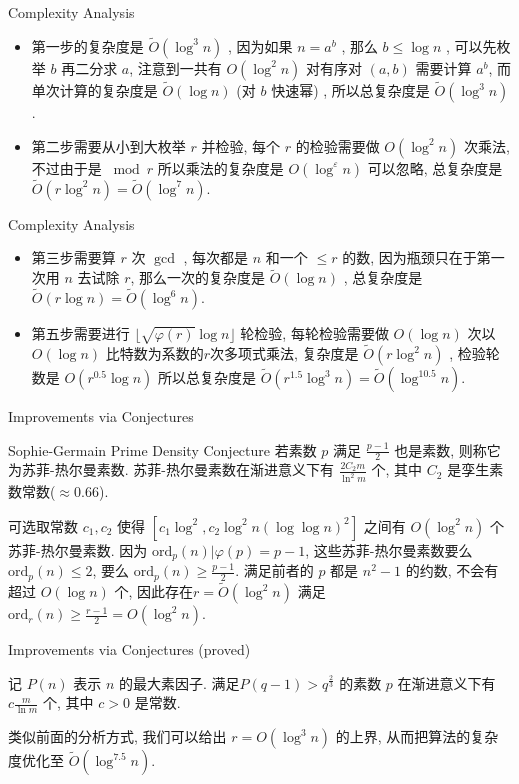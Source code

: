 \documentclass{beamer}
\def\le{\leqslant}
\def\ge{\geqslant}
\def\ord{\textrm{ord}}
\begin{document}
\begin{frame}{Complexity Analysis}
	\begin{itemize}
		\item 第一步的复杂度是 $\tilde O(\log^3n)$ , 因为如果 $n = a^b$ , 那么 $b \le \log n$ , 可以先枚举 $b$ 再二分求 $a$, 注意到一共有 $O(\log^2n)$ 对有序对 $(a, b)$ 需要计算 $a^b$, 而单次计算的复杂度是 $\tilde O(\log n)$ (对 $b$ 快速幂) , 所以总复杂度是 $\tilde O(\log^3n)$. \pause
		\item 第二步需要从小到大枚举 $r$ 并检验, 每个 $r$ 的检验需要做 $O(\log^2n)$ 次乘法, 不过由于是 $\bmod r$ 所以乘法的复杂度是 $O(\log^{\varepsilon} n)$ 可以忽略, 总复杂度是 $\tilde O(r\log^2n) = \tilde O(\log^7n)$.
	\end{itemize}
\end{frame}
\begin{frame}{Complexity Analysis}
	\begin{itemize}
		\item 第三步需要算 $r$ 次 $\gcd$ , 每次都是 $n$ 和一个 $\le r$ 的数, 因为瓶颈只在于第一次用 $n$ 去试除 $r$, 那么一次的复杂度是 $\tilde O(\log n)$ , 总复杂度是 $\tilde O(r\log n) = \tilde O(\log^6n)$. \pause
		\item 第五步需要进行 $\lfloor\sqrt{\varphi(r)}\log n\rfloor$ 轮检验, 每轮检验需要做 $O(\log n)$ 次以 $O(\log n)$ 比特数为系数的$r$次多项式乘法, 复杂度是 $\tilde O(r\log^2n)$ , 检验轮数是 $O(r^{0.5}\log n)$ 所以总复杂度是 $\tilde O(r^{1.5}\log^{3} n) = \tilde O(\log^{10.5}n)$.
	\end{itemize}
\end{frame}
\begin{frame}{Improvements via Conjectures}
	\begin{block}{Sophie-Germain Prime Density Conjecture}
		若素数 $p$ 满足 $\frac{p-1}{2}$ 也是素数, 则称它为苏菲-热尔曼素数. 苏菲-热尔曼素数在渐进意义下有 $\frac{2C_2m}{\ln^2m}$ 个, 其中 $C_2$ 是孪生素数常数($\approx 0.66$).
	\end{block}

	可选取常数 $c_1, c_2$ 使得 $[c_1\log^2, c_2\log^2n(\log\log n)^2]$ 之间有 $O(\log^2n)$ 个苏菲-热尔曼素数. 因为 $\ord_p(n) | \varphi(p) = p - 1$, 这些苏菲-热尔曼素数要么 $\ord_{p}(n) \le 2$, 要么 $\ord_p(n) \ge \frac{p-1}{2}$. 满足前者的 $p$ 都是 $n^2 - 1$ 的约数, 不会有超过 $O(\log n)$ 个, 因此存在$r = \tilde O(\log^2n)$ 满足 $\ord_r(n) \ge \frac{r-1}{2} = O(\log^2n)$.
\end{frame}
\begin{frame}{Improvements via Conjectures (proved)}
	\begin{lemma}
		记 $P(n)$ 表示 $n$ 的最大素因子. 满足$P(q - 1) > q^{\frac23}$ 的素数 $p$ 在渐进意义下有 $c\frac{m}{\ln m}$ 个, 其中 $c > 0$ 是常数.
	\end{lemma}

	类似前面的分析方式, 我们可以给出 $r = O(\log^3n)$ 的上界, 从而把算法的复杂度优化至 $\tilde O(\log^{7.5}n)$.
\end{frame}
\end{document}

